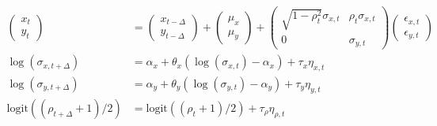 \documentclass[10pt]{article}
\begin{document}
\begin{align}
  \left( \begin{array}{c}
           x_t \\
           y_t
         \end{array} \right) &= \left( \begin{array}{c}
                                         x_{t-\Delta} \\
                                         y_{t-\Delta}
                                       \end{array} \right) +
  \left( \begin{array}{c}
           \mu_x \\
           \mu_y \end{array} \right) +
  \left( \begin{array}{cc}
           \sqrt{1-\rho_t^2}\sigma_{x,t} & \rho_t \sigma_{x,t} \\
           0 & \sigma_{y,t}
         \end{array} \right)
               \left( \begin{array}{c}
                        \epsilon_{x,t} \\
                        \epsilon_{y,t}
                      \end{array} \right) \\
  \log(\sigma_{x,t+\Delta}) &= \alpha_x + \theta_x(\log(\sigma_{x,t}) - \alpha_x) + \tau_x \eta_{x,t} \\
  \log(\sigma_{y,t+\Delta}) &= \alpha_y + \theta_y(\log(\sigma_{y,t}) - \alpha_y) + \tau_y \eta_{y,t} \\
  \mbox{logit}((\rho_{t+\Delta} + 1)/2) &= \mbox{logit}((\rho_{t}+1)/2) + \tau_{\rho} \eta_{\rho,t}
\end{align}



\end{document}
